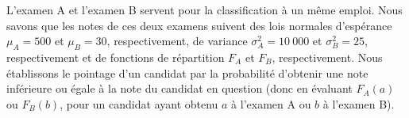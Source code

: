\begin{questions}

\pageblanche

\question\label{examnormal}
L'examen A et l'examen B servent pour la classification à un même emploi. 
Nous savons que les notes de ces deux examens suivent des lois normales d'espérance $\mu_{A}=500$ et $\mu_{B}=30$, respectivement, de variance $\sigma^2_{A}=10\ 000$ et $\sigma^2_{B}=25$, respectivement et de fonctions de répartition $F_A$ et $F_B$, respectivement.
Nous établissons le pointage d'un candidat par la probabilité d'obtenir une note inférieure ou égale à la note du candidat en question (donc en évaluant $F_A(a)$ ou $F_B(b)$, pour un candidat ayant obtenu $a$ à l'examen A ou $b$ à l'examen B). 

\vspace{0.5cm}
\end{questions}
